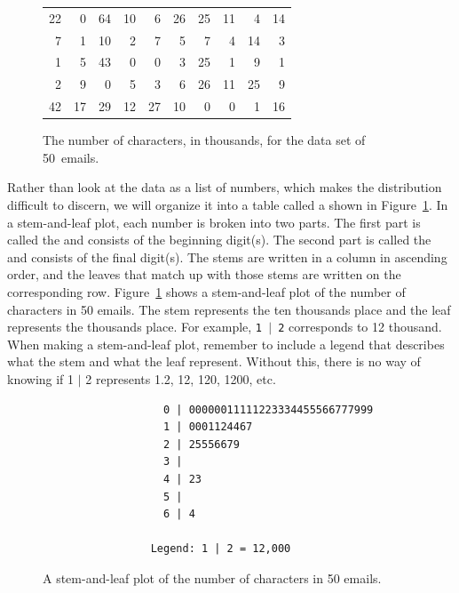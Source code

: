\setlength{\captionwidth}{0.9\textwidth}

\begin{figure}[ht]
\centering
\begin{tabular}{rrrrrrrrrr}
  \hline
 22 & 0 & 64 & 10 & 6 & 26 & 25 & 11 & 4 & 14 \\
  7 & 1 & 10 & 2 & 7 & 5 & 7 & 4 & 14 & 3 \\
   1 & 5 & 43 & 0 & 0 & 3 & 25 & 1 & 9 & 1 \\
  2 & 9 & 0 & 5 & 3 & 6 & 26 & 11 & 25 & 9 \\
  42 & 17 & 29 & 12 & 27 & 10 & 0 & 0 & 1 & 16 \\
   \hline
\end{tabular}
\caption{The number of characters, in thousands, for the data set of 50~emails.}
\end{figure}

\setlength{\captionwidth}{\mycaptionwidth}

Rather than look at the data as a list of numbers, which makes the distribution difficult to discern, we will organize it into a table called a  shown in Figure~\ref{stemandleafemail50}. In a stem-and-leaf plot, each number is broken into two parts. The first part is called the  and consists of the beginning digit(s). The second part is called the  and consists of the final digit(s). The stems are written in a column in ascending order, and the leaves that match up with those stems are written on the corresponding row. Figure~\ref{stemandleafemail50} shows a stem-and-leaf plot of the number of characters in 50 emails. The stem represents the ten thousands place and the leaf represents the thousands place. For example, \texttt{1 $|$ 2} corresponds to 12 thousand. When making a stem-and-leaf plot, remember to include a legend that describes what the stem and what the leaf represent. Without this, there is no way of knowing if 1 $|$ 2  represents 1.2, 12, 120, 1200, etc.

\begin{figure}[h]
\begin{verbatim}
                   0 | 00000011111223334455566777999
                   1 | 0001124467
                   2 | 25556679
                   3 |
                   4 | 23
                   5 |
                   6 | 4

                 Legend: 1 | 2 = 12,000
\end{verbatim}
\caption{A stem-and-leaf plot of the number of characters in 50 emails.}
\label{stemandleafemail50}
\end{figure}

